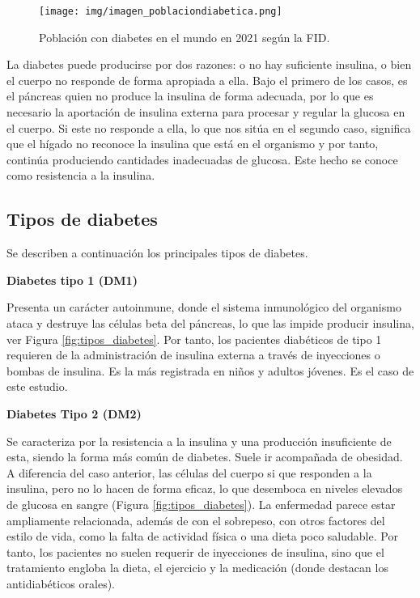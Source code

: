 \begin{figure}[h]
    \centering
    \texttt{[image: img/imagen\_poblaciondiabetica.png]}
    \caption{Población con diabetes en el mundo en 2021 según la FID.}
    \label{fig:poblacion}
\end{figure}



La diabetes puede producirse por dos razones: o no hay suficiente insulina, o bien el cuerpo no responde de forma apropiada a ella. Bajo el primero de los casos, es el páncreas quien no produce la insulina de forma adecuada, por lo que es necesario la aportación de insulina externa para procesar y regular la glucosa en el cuerpo. Si este no responde a ella, lo que nos sitúa en el segundo caso, significa que el hígado no reconoce la insulina que está en el organismo y por tanto, continúa produciendo cantidades inadecuadas de glucosa. Este hecho se conoce como resistencia a la insulina.

\subsection{Tipos de diabetes}
Se describen a continuación los principales tipos de diabetes.

\textbf{Diabetes tipo 1 (DM1)}

Presenta un carácter autoinmune, donde el sistema inmunológico del organismo ataca y destruye las células beta del páncreas, lo que las impide producir insulina, ver Figura \ref{fig:tipos_diabetes}. Por tanto, los pacientes diabéticos de tipo 1 requieren de la administración de insulina externa a través de inyecciones o bombas de insulina. Es la más registrada en niños y adultos jóvenes. Es el caso de este estudio.

\textbf{Diabetes Tipo 2 (DM2)}

Se caracteriza por la resistencia a la insulina y una producción insuficiente de esta, siendo la forma más común de diabetes. Suele ir acompañada de obesidad. A diferencia del caso anterior, las células del cuerpo si que responden a la insulina, pero no lo hacen de forma eficaz, lo que desemboca en niveles elevados de glucosa en sangre (Figura \ref{fig:tipos_diabetes}). La enfermedad parece estar ampliamente relacionada, además de con el sobrepeso,  con otros factores del estilo de vida, como la falta de actividad física o una dieta poco saludable. Por tanto, los pacientes no suelen requerir de inyecciones de insulina, sino que el tratamiento engloba la dieta, el ejercicio y la medicación (donde destacan los antidiabéticos orales). 

